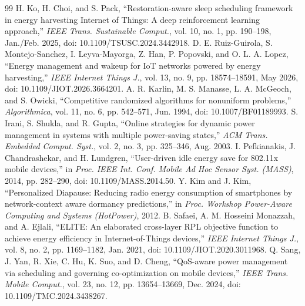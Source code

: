 \documentclass[journal]{IEEEtran}
\begin{document}
\begin{thebibliography}{99}
 H. Ko, H. Choi, and S. Pack, ``Restoration-aware sleep scheduling framework in energy harvesting Internet of Things: A deep reinforcement learning approach,'' \emph{IEEE Trans. Sustainable Comput.}, vol. 10, no. 1, pp. 190--198, Jan./Feb. 2025, doi: 10.1109/TSUSC.2024.3442918.
 D. E. Ruiz-Guirola, S. Montejo-Sanchez, I. Leyva-Mayorga, Z. Han, P. Popovski, and O. L. A. Lopez, ``Energy management and wakeup for IoT networks powered by energy harvesting,'' \emph{IEEE Internet Things J.}, vol. 13, no. 9, pp. 18574--18591, May 2026, doi: 10.1109/JIOT.2026.3664201.
 A. R. Karlin, M. S. Manasse, L. A. McGeoch, and S. Owicki, ``Competitive randomized algorithms for nonuniform problems,'' \emph{Algorithmica}, vol. 11, no. 6, pp. 542--571, Jun. 1994, doi: 10.1007/BF01189993.
 S. Irani, S. Shukla, and R. Gupta, ``Online strategies for dynamic power management in systems with multiple power-saving states,'' \emph{ACM Trans. Embedded Comput. Syst.}, vol. 2, no. 3, pp. 325--346, Aug. 2003.
 I. Pefkianakis, J. Chandrashekar, and H. Lundgren, ``User-driven idle energy save for 802.11x mobile devices,'' in \emph{Proc. IEEE Int. Conf. Mobile Ad Hoc Sensor Syst. (MASS)}, 2014, pp. 282--290, doi: 10.1109/MASS.2014.50.
 Y. Kim and J. Kim, ``Personalized Diapause: Reducing radio energy consumption of smartphones by network-context aware dormancy predictions,'' in \emph{Proc. Workshop Power-Aware Computing and Systems (HotPower)}, 2012.
 B. Safaei, A. M. Hosseini Monazzah, and A. Ejlali, ``ELITE: An elaborated cross-layer RPL objective function to achieve energy efficiency in Internet-of-Things devices,'' \emph{IEEE Internet Things J.}, vol. 8, no. 2, pp. 1169--1182, Jan. 2021, doi: 10.1109/JIOT.2020.3011968.
 Q. Sang, J. Yan, R. Xie, C. Hu, K. Suo, and D. Cheng, ``QoS-aware power management via scheduling and governing co-optimization on mobile devices,'' \emph{IEEE Trans. Mobile Comput.}, vol. 23, no. 12, pp. 13654--13669, Dec. 2024, doi: 10.1109/TMC.2024.3438267.
\end{thebibliography}
\end{document}
